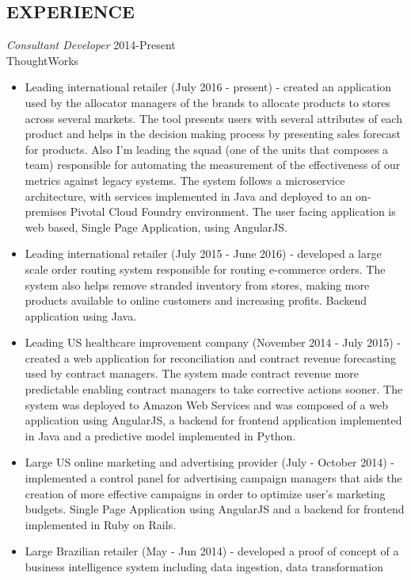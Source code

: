 \documentclass[line,margin]{res}
\begin{document}
\begin{resume}
\section{EXPERIENCE} {\sl Consultant Developer} \hfill 2014-Present\\
		ThoughtWorks
		\begin{itemize}
      \item Leading international retailer (July 2016 - present) - created an application used by the allocator managers of the brands to allocate products 
        to stores across several markets. The tool presents users with several attributes of each product and helps in the decision making process by presenting 
        sales forecast for products. Also I'm leading the squad (one of the units that composes a team) responsible for automating the measurement of the  effectiveness 
        of our metrics against legacy systems. The system follows a microservice architecture, with services implemented in Java and deployed to an on-premises Pivotal 
        Cloud Foundry environment. The user facing application is web based, Single Page Application, using AngularJS.
      \item Leading international retailer (July 2015 - June 2016) - developed a large scale order routing system responsible for routing e-commerce orders. The system
        also helps remove stranded inventory from stores, making more products available to online customers and increasing profits. Backend application using Java.
      \item Leading US healthcare improvement company (November 2014 - July 2015) - created a web application for reconciliation and contract revenue forecasting used 
        by contract managers. The system made contract revenue more predictable enabling contract managers to take corrective actions sooner. The system was deployed to 
        Amazon Web Services and was composed of a web application using AngularJS, a backend for frontend application implemented in Java and a predictive model 
        implemented in Python.
      \item Large US online marketing and advertising provider (July - October 2014) - implemented a control panel for advertising campaign managers that aids the 
        creation of more effective campaigns in order to optimize user's marketing budgets. Single Page Application using AngularJS and a backend for frontend 
        implemented in Ruby on Rails.
      \item Large Brazilian retailer (May - Jun 2014) - developed a proof of concept of a business intelligence system including data ingestion, data transformation 

\end{itemize}
\end{resume}
\end{document}
